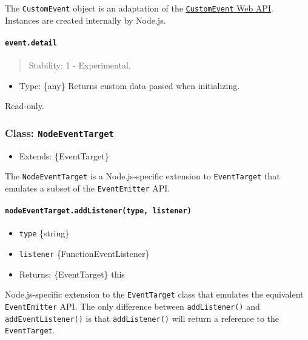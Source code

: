 The \texttt{CustomEvent} object is an adaptation of the
\href{https://dom.spec.whatwg.org/\#customevent}{\texttt{CustomEvent}
Web API}. Instances are created internally by Node.js.

\paragraph{\texorpdfstring{\texttt{event.detail}}{event.detail}}\label{event.detail}

\begin{quote}
Stability: 1 - Experimental.
\end{quote}

\begin{itemize}
\tightlist
\item
  Type: \{any\} Returns custom data passed when initializing.
\end{itemize}

Read-only.

\subsubsection{\texorpdfstring{Class:
\texttt{NodeEventTarget}}{Class: NodeEventTarget}}\label{class-nodeeventtarget}

\begin{itemize}
\tightlist
\item
  Extends: \{EventTarget\}
\end{itemize}

The \texttt{NodeEventTarget} is a Node.js-specific extension to
\texttt{EventTarget} that emulates a subset of the \texttt{EventEmitter}
API.

\paragraph{\texorpdfstring{\texttt{nodeEventTarget.addListener(type,\ listener)}}{nodeEventTarget.addListener(type, listener)}}\label{nodeeventtarget.addlistenertype-listener}

\begin{itemize}
\item
  \texttt{type} \{string\}
\item
  \texttt{listener} \{Function\textbar EventListener\}
\item
  Returns: \{EventTarget\} this
\end{itemize}

Node.js-specific extension to the \texttt{EventTarget} class that
emulates the equivalent \texttt{EventEmitter} API. The only difference
between \texttt{addListener()} and \texttt{addEventListener()} is that
\texttt{addListener()} will return a reference to the
\texttt{EventTarget}.


